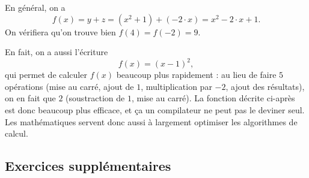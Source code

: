 {		En général, on a 
			\[ f(x) = y + z = (x^2 + 1) + (-2\cdot x) = x^2 - 2\cdot x + 1. \]
		On vérifiera qu'on trouve bien $f(4) = f(-2) = 9$.
		
		En fait, on a aussi l'écriture 
			\[ f(x) = (x-1)^2, \]
		qui permet de calculer $f(x)$ beaucoup plus rapidement : au lieu de faire $5$ opérations (mise au carré, ajout de $1$, multiplication par $-2$, ajout des résultats), on en fait que $2$ (soustraction de $1$, mise au carré).
		La fonction décrite ci-après est donc beaucoup plus efficace, et ça un compilateur ne peut pas le deviner seul.
		Les mathématiques servent donc aussi à largement optimiser les algorithmes de calcul.
	}
	
\else
\newpage
\fi
\subsection*{Exercices supplémentaires}

